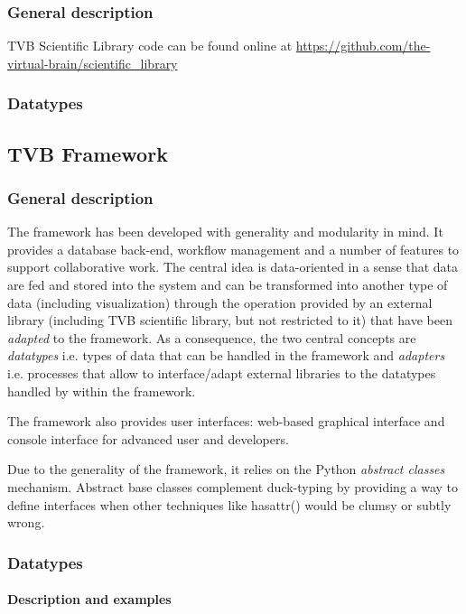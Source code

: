 	\subsubsection{General description}
TVB Scientific Library code can be found online at \url{https://github.com/the-virtual-brain/scientific_library}

	\subsubsection{Datatypes}


\subsection{TVB Framework}

	\subsubsection{General description}

The framework has been developed with generality and modularity in mind. It
provides a database back-end, workflow management and a number of features to
support collaborative work.  The central idea is data-oriented in a sense that
data are fed and stored into the system and can be transformed into another type
of data (including visualization) through the operation provided by an external
library (including TVB scientific library, but not restricted to it) that have
been \emph{adapted} to the framework. As a consequence, the two central concepts
are \emph{datatypes} i.e. types of data that can be handled in the framework and
\emph{adapters} i.e. processes that allow to interface/adapt external libraries
to  the datatypes handled by within the framework.

The framework also provides user interfaces: web-based graphical interface and
console interface for advanced user and developers.

Due to the generality of the framework, it relies on
the Python \emph{abstract classes} mechanism.
Abstract base classes complement duck-typing by providing a way to define
interfaces when other techniques like hasattr() would be clumsy or subtly wrong.

\subsubsection{Datatypes}

\paragraph{Description and examples}

